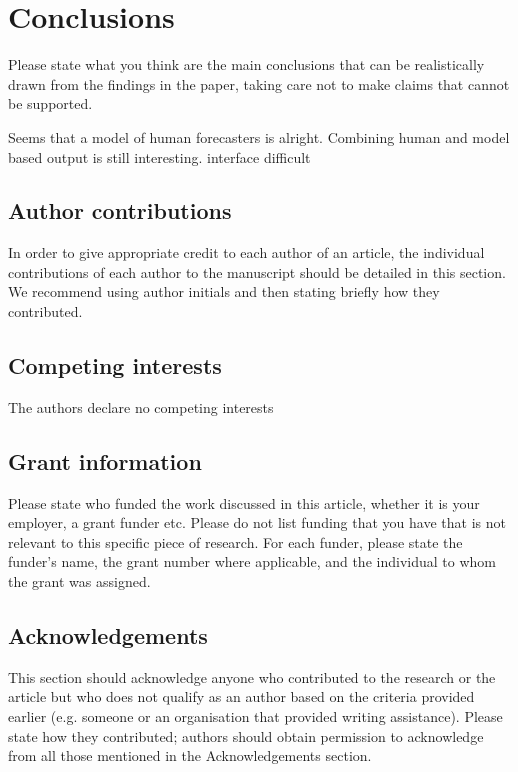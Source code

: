 \documentclass[10pt,a4paper,twocolumn]{article}
\begin{document}
\section*{Conclusions}
Please state what you think are the main conclusions that can be realistically drawn from the findings in the paper, taking care not to make claims that cannot be supported.

Seems that a model of human forecasters is alright. Combining human and model based output is still interesting. 
interface difficult











\subsection*{Author contributions}
In order to give appropriate credit to each author of an article, the individual
contributions of each author to the manuscript should be detailed in this section. We
recommend using author initials and then stating briefly how they contributed.

\subsection*{Competing interests}
The authors declare no competing interests

\subsection*{Grant information}
Please state who funded the work discussed in this article, whether it is your employer,
a grant funder etc. Please do not list funding that you have that is not relevant to this
specific piece of research. For each funder, please state the funder’s name, the grant
number where applicable, and the individual to whom the grant was assigned.

\subsection*{Acknowledgements}
This section should acknowledge anyone who contributed to the research or the
article but who does not qualify as an author based on the criteria provided earlier
(e.g. someone or an organisation that provided writing assistance). Please state how
they contributed; authors should obtain permission to acknowledge from all those
mentioned in the Acknowledgements section.
\end{document}
